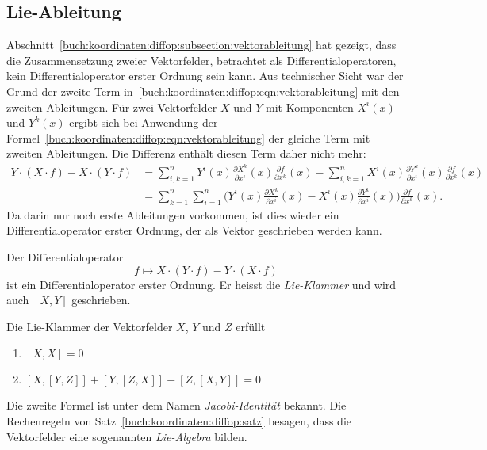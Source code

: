 %
%
\subsection{Lie-Ableitung}
Abschnitt~\ref{buch:koordinaten:diffop:subsection:vektorableitung}
hat gezeigt, dass die Zusammensetzung zweier Vektorfelder, betrachtet
als Differentialoperatoren, kein Differentialoperator erster Ordnung
sein kann.
Aus technischer Sicht war der Grund der zweite Term 
in~\eqref{buch:koordinaten:diffop:eqn:vektorableitung}
mit den zweiten Ableitungen.
Für zwei Vektorfelder $X$ und $Y$ mit Komponenten $X^i(x)$ und
$Y^k(x)$ ergibt sich bei Anwendung der
Formel~\eqref{buch:koordinaten:diffop:eqn:vektorableitung}
der gleiche Term mit zweiten Ableitungen.
Die Differenz enthält diesen Term daher nicht mehr:
\begin{align*}
Y\cdot(X\cdot f)
-
X\cdot(Y\cdot f)
&=
\sum_{i,k=1}^n
Y^i(x)\frac{\partial X^k}{\partial x^i}(x) \frac{\partial f}{\partial x^k}(x)
-
\sum_{i,k=1}^n
X^i(x)\frac{\partial Y^k}{\partial x^i}(x) \frac{\partial f}{\partial x^k}(x)
\\
&=
\sum_{k=1}^n
\sum_{i=1}^n
\biggl(
Y^i(x)\frac{\partial X^k}{\partial x^i}(x)
-
X^i(x)\frac{\partial Y^k}{\partial x^i}(x)
\biggr)
\frac{\partial f}{\partial x^k}(x).
\end{align*}
Da darin nur noch erste Ableitungen vorkommen, ist dies wieder
ein Differentialoperator erster Ordnung, der als Vektor
geschrieben werden kann.

\begin{definition}
\label{buch:koordinaten:diffop:def:lieableitung}
Der Differentialoperator 
\[
f\mapsto
X\cdot(Y\cdot f)
-
Y\cdot(X\cdot f)
\]
ist ein Differentialoperator erster Ordnung.
Er heisst die {\em Lie-Klammer} und wird auch $[X,Y]$
geschrieben.
\end{definition}

\begin{satz}
\label{buch:koordinaten:diffop:satz}
Die Lie-Klammer der Vektorfelder $X$, $Y$ und $Z$ erfüllt
\begin{enumerate}
\item $[X,X]=0$
\item $[X, [Y, Z]] + [Y, [Z, X]] + [Z, [X, Y]] = 0$
\end{enumerate}
\end{satz}

Die zweite Formel ist unter dem Namen {\em Jacobi-Identität} bekannt.
Die Rechenregeln von Satz~\ref{buch:koordinaten:diffop:satz} besagen,
dass die Vektorfelder eine sogenannten {\em Lie-Algebra} bilden.

